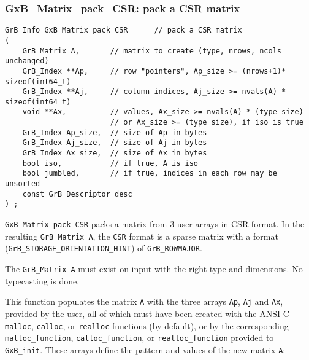 \documentclass[12pt]{article}
\begin{document}
\newpage
\subsubsection{{\sf GxB\_Matrix\_pack\_CSR:} pack a CSR matrix}
\label{matrix_pack_csr}

\begin{mdframed}[userdefinedwidth=6in]
{\footnotesize
\begin{verbatim}
GrB_Info GxB_Matrix_pack_CSR      // pack a CSR matrix
(
    GrB_Matrix A,       // matrix to create (type, nrows, ncols unchanged)
    GrB_Index **Ap,     // row "pointers", Ap_size >= (nrows+1)* sizeof(int64_t)
    GrB_Index **Aj,     // column indices, Aj_size >= nvals(A) * sizeof(int64_t)
    void **Ax,          // values, Ax_size >= nvals(A) * (type size)
                        // or Ax_size >= (type size), if iso is true
    GrB_Index Ap_size,  // size of Ap in bytes
    GrB_Index Aj_size,  // size of Aj in bytes
    GrB_Index Ax_size,  // size of Ax in bytes
    bool iso,           // if true, A is iso
    bool jumbled,       // if true, indices in each row may be unsorted
    const GrB_Descriptor desc
) ;
\end{verbatim}
} \end{mdframed}

\verb'GxB_Matrix_pack_CSR' packs a matrix from 3 user arrays in CSR format.
In the resulting \verb'GrB_Matrix A', the \verb'CSR' format is a sparse matrix
with a format (\verb'GrB_STORAGE_ORIENTATION_HINT') of \verb'GrB_ROWMAJOR'.

The \verb'GrB_Matrix A' must exist on input with the right type and
dimensions.  No typecasting is done.

This function populates the matrix
\verb'A' with the three arrays \verb'Ap', \verb'Aj' and \verb'Ax', provided by
the user, all of which must have been created with the ANSI C \verb'malloc',
\verb'calloc', or \verb'realloc' functions (by default), or by the
corresponding \verb'malloc_function', \verb'calloc_function', or
\verb'realloc_function' provided to \verb'GxB_init'.  These arrays define the
pattern and values of the new matrix \verb'A':
\end{document}
